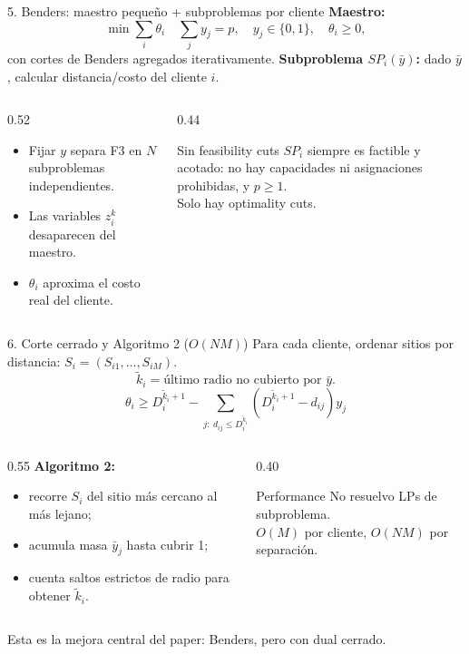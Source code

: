 \documentclass[10pt,aspectratio=169]{beamer}
\newcommand{\kt}{\tilde{k}}
\begin{document}
\begin{frame}{5. Benders: maestro pequeño + subproblemas por cliente}
\textbf{Maestro:}
\[
  \min\sum_i\theta_i \quad
  \sum_j y_j=p,\quad y_j\in\{0,1\},\quad \theta_i\ge0,
\]
con cortes de Benders agregados iterativamente.
\vfill
\textbf{Subproblema $SP_i(\bar y)$:} dado $\bar y$, calcular distancia/costo del cliente $i$.
\begin{columns}
\begin{column}{0.52\textwidth}
\begin{itemize}
  \item Fijar $y$ separa F3 en $N$ subproblemas independientes.
  \item Las variables $z_i^k$ desaparecen del maestro.
  \item $\theta_i$ aproxima el costo real del cliente.
\end{itemize}
\end{column}
\begin{column}{0.44\textwidth}
\begin{block}{Sin feasibility cuts}
$SP_i$ siempre es factible y acotado: no hay capacidades ni asignaciones prohibidas, y $p\ge1$.\\
Solo hay optimality cuts.
\end{block}
\end{column}
\end{columns}
\end{frame}

\begin{frame}{6. Corte cerrado y Algoritmo 2 ($O(NM)$)}
Para cada cliente, ordenar sitios por distancia: $S_i=(S_{i1},\dots,S_{iM})$.
\[
  \kt_i=\text{último radio no cubierto por } \bar y.
\]
\vspace{-2mm}
\[
  \theta_i \ge D_i^{\kt_i+1}
  -\sum_{j:\ d_{ij}\le D_i^{\kt_i}}(D_i^{\kt_i+1}-d_{ij})y_j
\]
\begin{columns}
\begin{column}{0.55\textwidth}
\textbf{Algoritmo 2:}
\begin{itemize}
  \item recorre $S_i$ del sitio más cercano al más lejano;
  \item acumula masa $\bar y_j$ hasta cubrir 1;
  \item cuenta saltos estrictos de radio para obtener $\kt_i$.
\end{itemize}
\end{column}
\begin{column}{0.40\textwidth}
\begin{block}{Performance}
No resuelvo LPs de subproblema.\\
$O(M)$ por cliente, $O(NM)$ por separación.
\end{block}
\end{column}
\end{columns}
\vfill
\footnotesize Esta es la mejora central del paper: Benders, pero con dual cerrado.
\end{frame}
\end{document}
